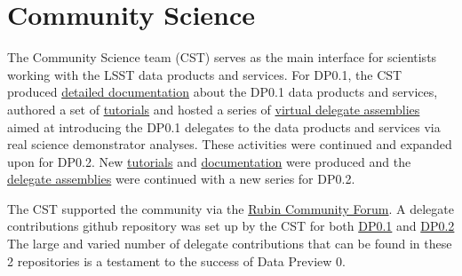 \section{Community Science} \label{sec:cst}

The Community Science team (CST) serves as the main interface for scientists working with the LSST data products and services. 
For DP0.1, the CST produced \href{https://dp0-1.lsst.io/}{detailed documentation} about the DP0.1 data products and services, authored a set of \href{https://github.com/rubin-dp0/tutorial-notebooks}{tutorials} and hosted a series of \href{https://dp0-1.lsst.io/dp0-delegate-resources/index.html\#dp0-delegate-assemblies}{virtual delegate assemblies} aimed at introducing the DP0.1 delegates to the data products and services via real science demonstrator analyses.
These activities were continued and expanded upon for DP0.2. 
New \href{https://github.com/rubin-dp0/tutorial-notebooks}{tutorials} and  \href{dp0-2.lsst.io}{documentation} were produced and the \href{https://dp0-2.lsst.io/dp0-delegate-resources/index.html\#dp0-delegate-assemblies}{delegate assemblies} were continued with a new series for DP0.2.

The CST supported the community via the \href{community.lsst.org}{Rubin Community Forum}. 
A delegate contributions github repository was set up by the CST for both \href{https://github.com/rubin-dp0/delegate-contributions-dp01}{DP0.1} and \href{https://github.com/rubin-dp0/delegate-contributions-dp02}{DP0.2}
The large and varied number of delegate contributions that can be found in these 2 repositories is a testament to the success of Data Preview 0. 